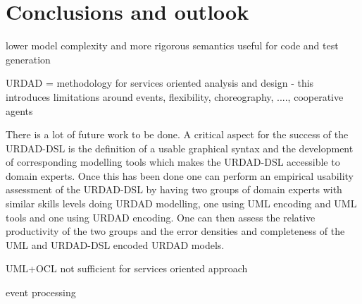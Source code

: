 \section{Conclusions and outlook \label{sec:conclusionsAndOutlook}}

lower model complexity and more rigorous semantics useful for code and test generation

URDAD = methodology for services oriented analysis and design - this introduces limitations around events, flexibility, choreography, ...., cooperative agents

There is a lot of future work to be done. A critical aspect for the success of the URDAD-DSL is the definition of a usable graphical syntax and the development of corresponding modelling tools which makes the URDAD-DSL accessible to domain experts. Once this has been done one can perform an empirical usability assessment of the URDAD-DSL by having two groups of domain experts with similar skills levels doing URDAD modelling, one using UML encoding and UML tools and one using URDAD encoding. One can then assess the relative productivity of the two groups and the error densities and completeness of the UML and URDAD-DSL encoded URDAD models.

UML+OCL not sufficient for services oriented approach

event processing
